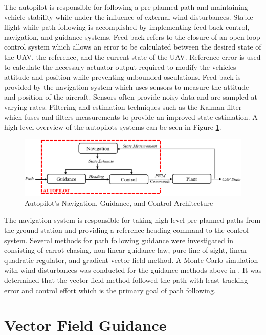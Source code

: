 \documentclass[numbered,pdftex]{ohio-etd}
\begin{document}
The autopilot is responsible for following a pre-planned path and maintaining vehicle stability while under the influence of external wind disturbances. Stable flight while path following is accomplished by implementing feed-back control, navigation, and guidance systems. Feed-back refers to the closure of an open-loop control system which allows an error to be calculated between the desired state of the UAV, the reference, and the current state of the UAV. Reference error is used to calculate the necessary actuator output required to modify the vehicles attitude and position while preventing unbounded osculations. Feed-back is provided by the navigation system which uses sensors to measure the attitude and position of the aircraft. Sensors often provide noisy data and are sampled at varying rates. Filtering and estimation techniques such as the Kalman filter which fuses and filters measurements to provide an improved state estimation. A high level overview of the autopilots systems can be seen in Figure \ref{fig:autopilotloops}.

\begin{figure}
	\centering
	\includegraphics[width=15cm]{PaperFigures/autopilotLoops}
	\caption{Autopilot's Navigation, Guidance, and Control Architecture}
	\label{fig:autopilotloops}
\end{figure}

The navigation system is responsible for taking high level pre-planned paths from the ground station and providing a reference heading command to the control system. Several methods for path following guidance were investigated in \cite{sujit_unmanned_2014} consisting of carrot chasing, non-linear guidance law, pure line-of-sight, linear quadratic regulator, and gradient vector field method. A Monte Carlo simulation with wind disturbances was conducted for the guidance methods above in \cite{sujit_unmanned_2014}. It was determined that the vector field method followed the path with least tracking error and control effort which is the primary goal of path following. 


\section{Vector Field Guidance}
\end{document}

